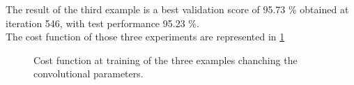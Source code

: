 The result of the third example is a best validation score of 95.73 \% obtained at iteration 546, with test performance 95.23 \%. \\

The cost function of those three experiments are represented in \ref{fig:LENETLFW_Cost}

\begin{figure}[htb]
    \centering

    \caption{Cost function at training of the three examples chanching the convolutional parameters.} \label{fig:LENETLFW_Cost}
\end{figure}



